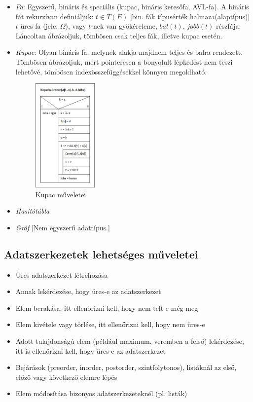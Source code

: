 \documentclass[12pt,margin=0px]{article}
\begin{document}
\begin{itemize}
        \item \textit{Fa}: Egyszerű, bináris és speciális (kupac, bináris keresőfa, AVL-fa). A bináris fát rekurzívan definiáljuk: $t \in T(E)$ [bin. fák típusérték halmaza(alaptípus)] $t$ üres fa (jele: $\Omega$), vagy $t$-nek van gyökéreleme, $bal(t)$, $jobb(t)$ részfája. Láncoltan ábrázoljuk, tömbösen csak teljes fák, illetve kupac esetén.
        \item \textit{Kupac}: Olyan bináris fa, melynek alakja majdnem teljes és balra rendezett. Tömbösen ábrázoljuk, mert pointeresen a bonyolult lépkedést nem teszi lehetővé, tömbösen indexösszefüggésekkel könnyen megoldható.
		\begin{figure}[H]
			\centering
			\includegraphics[width=0.3\textwidth]{img/KupacbaBeszur.jpg}
			\caption{Kupac műveletei}
		\end{figure}
		\item \textit{Hasítótábla}
		\item \textit{Gráf} [Nem egyszerű adattípus.]
	\end{itemize}
	
	\subsection*{Adatszerkezetek lehetséges műveletei}
	
	\begin{itemize}
		\item Üres adatszerkezet létrehozása
		\item Annak lekérdezése, hogy üres-e az adatszerkezet
		\item Elem berakása, itt ellenőrizni kell, hogy nem telt-e még meg
		\item Elem kivétele vagy törlése, itt ellenőrizni kell, hogy nem üres-e
		\item Adott tulajdonságú elem (például maximum, veremben a felső) lekérdezése, itt is ellenőrizni kell, hogy üres-e az adatszerkezet
		\item Bejárások (preorder, inorder, postorder, szintfolytonos), listáknál az első, előző vagy következő elemre lépés
		\item Elem módosítása bizonyos adatszerkezeteknél (pl. listák)
	\end{itemize}
	
\end{document}
